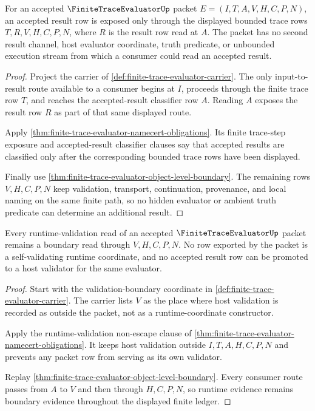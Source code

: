 \begin{theorem}
\label{thm:finite-trace-evaluator-evaluation-determinacy}
For an accepted $\FiniteTraceEvaluatorUp$ packet
$E=(I,T,A,V,H,C,P,N)$, an accepted result row is exposed only through the
displayed bounded trace rows $T,R,V,H,C,P,N$, where $R$ is the result row read
at $A$. The packet has no second result channel, host evaluator coordinate,
truth predicate, or unbounded execution stream from which a consumer could read
an accepted result.
\end{theorem}
\begin{proof}
Project the carrier of \autoref{def:finite-trace-evaluator-carrier}. The only
input-to-result route available to a consumer begins at $I$, proceeds through
the finite trace row $T$, and reaches the accepted-result classifier row $A$.
Reading $A$ exposes the result row $R$ as part of that same displayed route.

Apply \autoref{thm:finite-trace-evaluator-namecert-obligations}. Its finite
trace-step exposure and accepted-result classifier clauses say that accepted
results are classified only after the corresponding bounded trace rows have
been displayed.

Finally use \autoref{thm:finite-trace-evaluator-object-level-boundary}. The
remaining rows $V,H,C,P,N$ keep validation, transport, continuation,
provenance, and local naming on the same finite path, so no hidden evaluator or
ambient truth predicate can determine an additional result.
\end{proof}

\begin{theorem}
\label{thm:finite-trace-evaluator-boundary-exhaustion}
Every runtime-validation read of an accepted $\FiniteTraceEvaluatorUp$ packet
remains a boundary read through $V,H,C,P,N$. No row exported by the packet is a
self-validating runtime coordinate, and no accepted result row can be promoted
to a host validator for the same evaluator.
\end{theorem}
\begin{proof}
Start with the validation-boundary coordinate in
\autoref{def:finite-trace-evaluator-carrier}. The carrier lists $V$ as the
place where host validation is recorded as outside the packet, not as a
runtime-coordinate constructor.

Apply the runtime-validation non-escape clause of
\autoref{thm:finite-trace-evaluator-namecert-obligations}. It keeps host
validation outside $I,T,A,H,C,P,N$ and prevents any packet row from serving as
its own validator.

Replay \autoref{thm:finite-trace-evaluator-object-level-boundary}. Every
consumer route passes from $A$ to $V$ and then through $H,C,P,N$, so runtime
evidence remains boundary evidence throughout the displayed finite ledger.
\end{proof}

